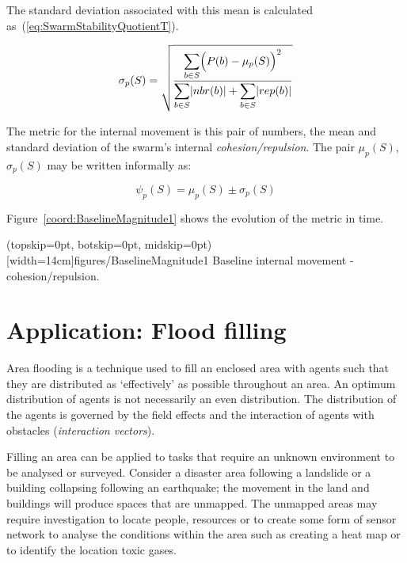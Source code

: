 \documentclass{ieeeaccess}
\begin{document}
The standard deviation associated with this mean is calculated as~(\ref{eq:SwarmStabilityQuotientT}).

\begin{equation}
\label{eq:SwarmStabilityQuotientT}
\sigma_p(S) = \sqrt{\frac{\mathlarger{\sum_{b \in S}}\Big(P(b)-\mu_p(S)\Big)^2}{\mathlarger{\sum_{b \in S}}|nbr(b)| + \mathlarger{\sum_{b \in S}}|rep(b)|}}
\end{equation}

The metric for the internal movement is this pair of numbers, the mean and standard deviation of the swarm's internal \emph{cohesion/repulsion}. The pair $\mu_p(S)$, $\sigma_p(S)$ may be written informally as: 

\begin{equation}
\label{eq:SwarmPotentialMagnitude}
\psi_p(S) = \mu_p(S)\pm \sigma_p(S)
\end{equation}

Figure~\ref{coord:BaselineMagnitude1} shows the evolution of the metric in time.

\Figure[t!](topskip=0pt, botskip=0pt, midskip=0pt)[width=14cm]{figures/BaselineMagnitude1}
{Baseline internal movement - cohesion/repulsion.\label{coord:BaselineMagnitude1}}


\section{Application: Flood filling}\label{metric:ApplicationFloodFilling}

Area flooding is a technique used to fill an enclosed area with agents such that they are distributed as `effectively' as possible throughout an area. An optimum distribution of agents is not necessarily an even distribution. The distribution of the agents is governed by the field effects and the interaction of agents with obstacles (\textit{interaction vectors}). 

Filling an area can be applied to tasks that require an unknown environment to be analysed or surveyed. Consider a disaster area following a landslide or a building collapsing following an earthquake; the movement in the land and buildings will produce spaces that are unmapped. The unmapped areas may require investigation to locate people, resources or to create some form of sensor network to analyse the conditions within the area such as creating a heat map or to identify the location toxic gases. 
\end{document}
